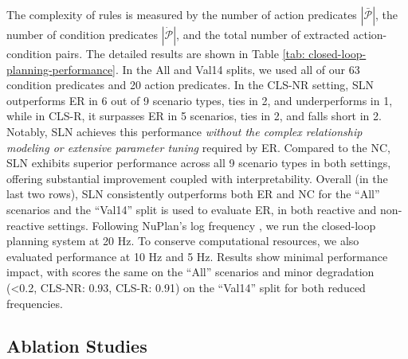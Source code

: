 The complexity of rules is measured by the number of action predicates $|\bar{\mathcal{P}}|$, the number of condition predicates $|\dot{\mathcal{P}}|$, and the total number of extracted action-condition pairs. The detailed results are shown in Table \ref{tab: closed-loop-planning-performance}. In the All and Val14 splits, we used all of our 63 condition predicates and 20 action predicates. In the CLS-NR setting, SLN outperforms ER in 6 out of 9 scenario types, ties in 2, and underperforms in 1, while in CLS-R, it surpasses ER in 5 scenarios, ties in 2, and falls short in 2. Notably, SLN achieves this performance \textit{without the complex relationship modeling or extensive parameter tuning} required by ER. Compared to the NC, SLN exhibits superior performance across all 9 scenario types in both settings, offering substantial improvement coupled with interpretability. Overall (in the last two rows), SLN consistently outperforms both ER and NC for the ``All'' scenarios and the ``Val14'' \cite{Dauner2023CORL} split is used to evaluate ER, in both reactive and non-reactive settings. Following NuPlan's log frequency \cite{Karnchanachari2024TowardsLP}, we run the closed-loop planning system at 20 Hz. To conserve computational resources, we also evaluated performance at 10 Hz and 5 Hz. Results show minimal performance impact, with scores the same on the ``All'' scenarios and minor degradation (<0.2, CLS-NR: 0.93, CLS-R: 0.91) on the ``Val14'' split for both reduced frequencies.

\subsection{Ablation Studies}
\label{sec:ablation-studies}

